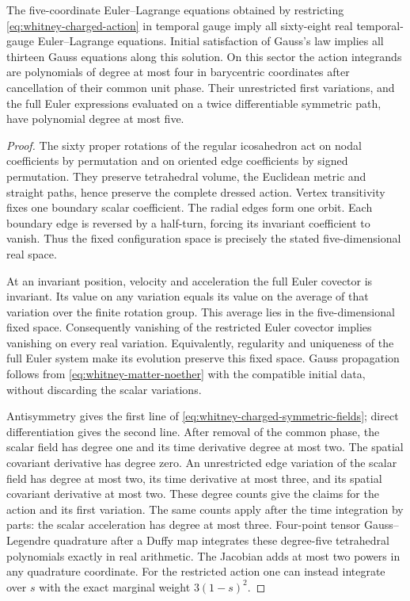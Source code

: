\begin{proposition}
\label{prop:whitney-charged-symmetric-lift}
The five-coordinate Euler--Lagrange equations obtained by restricting
\eqref{eq:whitney-charged-action} in temporal gauge imply all sixty-eight
real temporal-gauge Euler--Lagrange equations. Initial satisfaction of
Gauss's law implies all thirteen Gauss equations along this solution.
On this sector the action integrands are polynomials of degree at most
four in barycentric coordinates after cancellation of their common unit
phase. Their unrestricted first variations, and the full Euler
expressions evaluated on a twice differentiable symmetric path, have
polynomial degree at most five.
\end{proposition}
\begin{proof}
The sixty proper rotations of the regular icosahedron act on nodal
coefficients by permutation and on oriented edge coefficients by signed
permutation. They preserve tetrahedral volume, the Euclidean metric and
straight paths, hence preserve the complete dressed action. Vertex
transitivity fixes one boundary scalar coefficient. The radial edges
form one orbit. Each boundary edge is reversed by a half-turn, forcing
its invariant coefficient to vanish. Thus the fixed configuration
space is precisely the stated five-dimensional real space.

At an invariant position, velocity and acceleration the full Euler
covector is invariant. Its value on any variation equals its value on
the average of that variation over the finite rotation group. This
average lies in the five-dimensional fixed space. Consequently
vanishing of the restricted Euler covector implies vanishing on every
real variation. Equivalently, regularity and uniqueness of the full
Euler system make its evolution preserve this fixed space. Gauss
propagation follows from \eqref{eq:whitney-matter-noether} with the
compatible initial data, without discarding the scalar variations.

Antisymmetry gives the first line of
\eqref{eq:whitney-charged-symmetric-fields}; direct differentiation gives
the second line. After removal of the common phase, the scalar field
has degree one and its time derivative degree at most two. The spatial
covariant derivative has degree zero. An unrestricted edge variation
of the scalar field has degree at most two, its time derivative at most
three, and its spatial covariant derivative at most two. These degree
counts give the claims for the action and its first variation. The
same counts apply after the time integration by parts: the scalar
acceleration has degree at most three. Four-point tensor
Gauss--Legendre quadrature after a Duffy map integrates these degree-five
tetrahedral polynomials exactly in real arithmetic. The Jacobian adds
at most two powers in any quadrature coordinate. For the restricted
action one can instead integrate over \(s\) with the exact marginal
weight \(3(1-s)^2\).
\end{proof}

